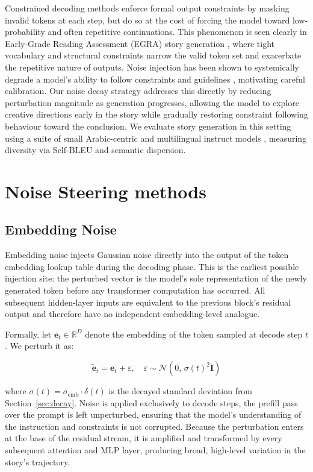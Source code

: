 \documentclass[11pt]{article}
\begin{document}
Constrained decoding methods \cite{willard2023efficient} enforce formal output constraints by masking invalid tokens at each step, but do so at the cost of forcing the model toward low-probability and often repetitive continuations. This phenomenon is seen clearly in Early-Grade Reading Assessment (EGRA) story generation \cite{rti2016egra, zualkernan2024EGRA}, where tight vocabulary and structural constraints narrow the valid token set and exacerbate the repetitive nature of outputs. Noise injection has been shown to systemically degrade a model's ability to follow constraints and guidelines \cite{shahani2025noise}, motivating careful calibration. Our noise decay strategy addresses this directly by reducing perturbation magnitude as generation progresses, allowing the model to explore creative directions early in the story while gradually restoring constraint following behaviour toward the conclusion. We evaluate story generation in this setting using a suite of small
Arabic-centric and multilingual instruct models \cite{sengupta2023jais,bari2024allam,huang2024acegpt,fanar2025}, measuring diversity via Self-BLEU \cite{zhu2018texygen} and semantic dispersion.
\section{Noise Steering methods}
\subsection{Embedding Noise}
Embedding noise injects Gaussian noise directly into the output of the token embedding lookup table during the decoding phase. This is the earliest possible injection site: the perturbed vector is the model's sole representation of the newly generated token before any transformer computation has occurred. All subsequent hidden-layer inputs are equivalent to the previous block's residual output and therefore have no independent embedding-level analogue.

Formally, let $\mathbf{e}_t \in \mathbb{R}^D$ denote the embedding of the token sampled at decode step $t$. We perturb it as:

\begin{equation}
    \tilde{\mathbf{e}}_t = \mathbf{e}_t + \varepsilon, \quad
    \varepsilon \sim \mathcal{N}\!\left(0,\, \sigma(t)^2 \mathbf{I}\right)
\end{equation}

where $\sigma(t) = \sigma_{\text{emb}} \cdot \delta(t)$ is the decayed standard deviation from Section~\ref{sec:decay}. Noise is applied exclusively to decode steps, the prefill pass over the prompt is left unperturbed, ensuring that the model's understanding of the instruction and constraints is not corrupted. Because the perturbation enters at the base of the residual stream, it is amplified and transformed by every subsequent attention and MLP layer, producing broad, high-level variation in the story's trajectory.
\end{document}
